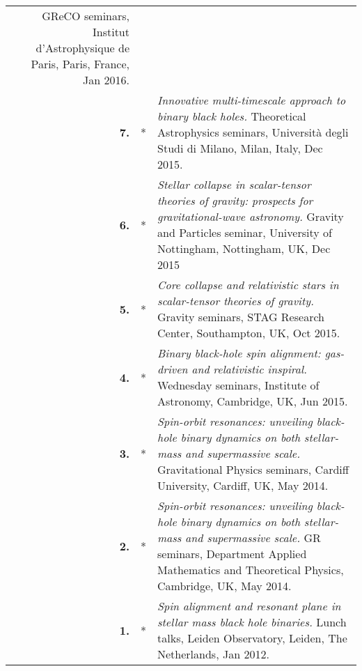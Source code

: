 \documentclass[letterpaper]{moderncv}
\begin{document}
{\begin{longtable}{rp{0.4cm}p{15.8cm}}
\newline{} 
GReCO seminars, Institut d'Astrophysique de Paris, Paris, France, Jan 2016.
\vspace{0.05cm}\\
%
\textbf{7.} & *& \textit{Innovative multi-timescale approach to binary black holes.}
\newline{} 
Theoretical Astrophysics seminars, Università degli Studi di Milano, Milan, Italy, Dec 2015.
\vspace{0.05cm}\\
%
\textbf{6.} & *& \textit{Stellar collapse in scalar-tensor theories of gravity: prospects for gravitational-wave astronomy.}
\newline{} 
Gravity and Particles seminar, University of Nottingham, Nottingham, UK, Dec 2015
\vspace{0.05cm}\\
%
\textbf{5.} & *& \textit{Core collapse and relativistic stars in scalar-tensor theories of gravity.}
\newline{} 
Gravity seminars, STAG Research Center, Southampton, UK, Oct 2015.
\vspace{0.05cm}\\
%
\textbf{4.} & *& \textit{Binary black-hole spin alignment: gas-driven and relativistic inspiral.}
\newline{} 
Wednesday seminars, Institute of Astronomy, Cambridge, UK, Jun 2015.\vspace{0.05cm}\\
%
\textbf{3.} & *& \textit{Spin-orbit resonances: unveiling black-hole binary dynamics on both stellar-mass and supermassive scale.}
\newline{} 
Gravitational Physics seminars, Cardiff University, Cardiff, UK, May 2014.
\vspace{0.05cm}\\
%
\textbf{2.} & *& \textit{Spin-orbit resonances: unveiling black-hole binary dynamics on both stellar-mass and supermassive scale.}
\newline{} 
GR seminars, Department Applied Mathematics and Theoretical Physics, Cambridge, UK, May 2014.
\vspace{0.05cm}\\
%
\textbf{1.} & *& \textit{Spin alignment and resonant plane in stellar mass black hole binaries.}
\newline{} 
Lunch talks, Leiden Observatory, Leiden, The Netherlands, Jan 2012.
\vspace{0.05cm}\\
%
\end{longtable}
}
\end{document}
